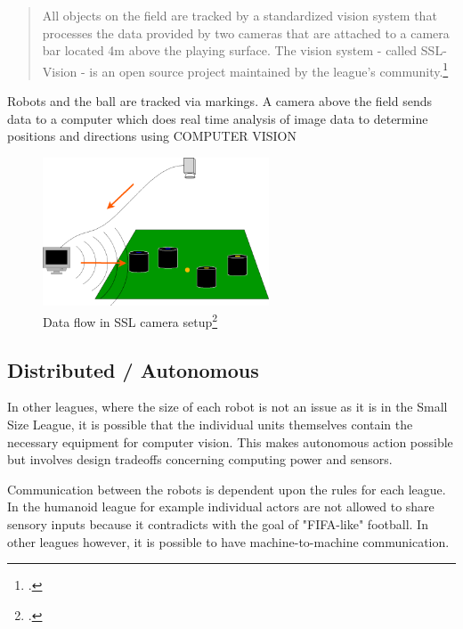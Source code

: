 \begin{quote}
All objects on the field are tracked by a standardized vision system that
processes the data provided by two cameras that are attached to a camera bar
located 4m above the playing surface. The vision system - called SSL-Vision - is
an open source project maintained by the league's community.\footcite[Cf.][]{robo_ssl_wiki}
\end{quote}

Robots and the ball are tracked via markings. A camera above the field sends
data to a computer which does real time analysis of image data to determine
positions and directions using COMPUTER VISION

\begin{savenotes}
\begin{figure}[htbp]
\begin{center}
  \includegraphics[width=0.6\textwidth]{img/ssl_dataflow.png}
  \caption[Data flow in SSL camera setup]{Data flow in SSL camera setup\footcite[][]{robo_ssl_wiki}}
  \label{fig:ssl_dataflow}
\end{center}
\end{figure}
\end{savenotes}

\subsection{Distributed / Autonomous}
In other leagues, where the size of each robot is not an issue as it is in the Small Size League, it is possible that the individual units themselves contain the necessary equipment for computer vision. This makes autonomous action possible but involves design tradeoffs concerning computing power and sensors.

Communication between the robots is dependent upon the rules for each league. In the humanoid league for example individual actors are not allowed to share sensory inputs because it contradicts with the goal of "FIFA-like" football.
In other leagues however, it is possible to have machine-to-machine communication.

